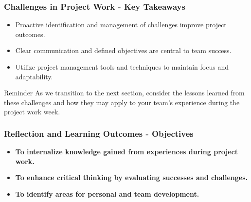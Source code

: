 \documentclass[aspectratio=169]{beamer}
\begin{document}
\begin{frame}[fragile]
    \frametitle{Challenges in Project Work - Key Takeaways}
    \begin{itemize}
        \item Proactive identification and management of challenges improve project outcomes.
        \item Clear communication and defined objectives are central to team success.
        \item Utilize project management tools and techniques to maintain focus and adaptability.
    \end{itemize}
    \begin{block}{Reminder}
        As we transition to the next section, consider the lessons learned from these challenges and how they may apply to your team's experience during the project work week.
    \end{block}
\end{frame}

\begin{frame}[fragile]
    \frametitle{Reflection and Learning Outcomes - Objectives}
    \begin{itemize}
        \item \textbf{To internalize knowledge gained from experiences during project work.}
        \item \textbf{To enhance critical thinking by evaluating successes and challenges.}
        \item \textbf{To identify areas for personal and team development.}
    \end{itemize}
\end{frame}
\end{document}
